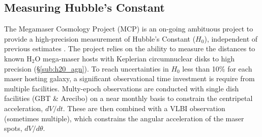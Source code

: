 
\subsection{Measuring Hubble's Constant}
\label{sub:h2o_cosmo}

The Megamaser Cosmology Project (MCP) is an on-going ambituous project to provide a high-precision measurement of Hubble's Constant ($H_0$), independent of previous estimates \citep{reid2009_mmproject_I}. The project relies on the ability to measure the distances to known H$_2$O mega-maser hosts with Keplerian circumnuclear disks to high precision (\S\ref{sub:h20_agn}). To reach uncertainties in $H_0$ less than 10\% for each maser hosting galaxy, a significant observational time investment is require from multiple facilities. Multy-epoch observations are conducted with single dish facilities (GBT \& Arecibo) on a near monthly basis to constrain the centripetal acceleration, $dV/dt$. These are then combined with a VLBI observation (sometimes multiple), which constrains the angular acceleration of the maser spots, $dV/d\theta$.


